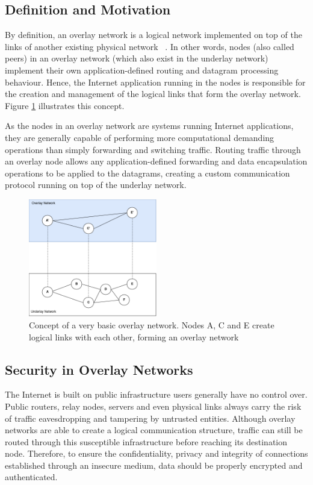 \documentclass[11pt,twoside,a4paper]{report}
\begin{document}
\subsection{Definition and Motivation}

By definition, an overlay network is a logical network implemented on top of the links of another existing physical network ~\cite{livronet}. In other words, nodes (also called peers) in an overlay network (which also exist in the underlay network) implement their own application-defined routing and datagram processing behaviour. Hence, the Internet application running in the nodes is responsible for the creation and management of the logical links that form the overlay network. Figure \ref{fig:overlay} illustrates this concept.

As the nodes in an overlay network are systems running Internet applications, they are generally capable of performing more computational demanding operations than simply forwarding and switching traffic. Routing traffic through an overlay node allows any application-defined forwarding and data encapsulation operations to be applied to the datagrams, creating a custom communication protocol running on top of the underlay network.

\begin{figure}[h]
\centering
\includegraphics[width=0.5\textwidth]{overlays.png}
\caption{Concept of a very basic overlay network. Nodes A, C and E create logical links with each other, forming an overlay network}
\label{fig:overlay}
\end{figure}

\subsection{Security in Overlay Networks}

The Internet is built on public infrastructure users generally have no control over. Public routers, relay nodes, servers and even physical links always carry the risk of traffic eavesdropping and tampering by untrusted entities. Although overlay networks are able to create a logical communication structure, traffic can still be routed through this susceptible infrastructure before reaching its destination node. Therefore, to ensure the confidentiality, privacy and integrity of connections established through an insecure medium, data should be properly encrypted and authenticated.
\end{document}
